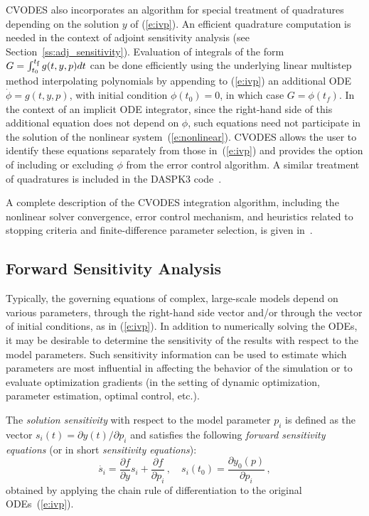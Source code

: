 CVODES also incorporates an algorithm for special treatment of
quadratures depending on the solution $y$ of (\ref{e:ivp}).
An efficient quadrature computation is needed in the context of
adjoint sensitivity analysis (see Section~\ref{ss:adj_sensitivity}).
Evaluation of integrals of the form
$G = \int_{t_0}^{t_\mb{f}} g(t,y,p) dt$ can be done efficiently using the
underlying linear multistep method interpolating polynomials by
appending to (\ref{e:ivp}) an additional ODE
$\dot\phi = g(t,y,p)$, with initial condition $\phi(t_0) = 0$,
in which case $G = \phi(t_f)$. In the context of an implicit ODE
integrator, since the right-hand side of this additional equation does not
depend on $\phi$, such equations need not participate in the solution of
the nonlinear system~(\ref{e:nonlinear}). CVODES allows the user to
identify these equations separately from those in~(\ref{e:ivp}) and
provides the option of including or excluding $\phi$ from the error
control algorithm.
A similar treatment of quadratures is included in the DASPK3
code~\cite{LiPe:99a,LiPe:00}.


A complete description of the CVODES integration algorithm, including 
the nonlinear solver convergence, error control mechanism, and heuristics 
related to stopping criteria and finite-difference parameter selection, is
given in~\cite{HBGLSSW:04}.


\subsection{Forward Sensitivity Analysis}\label{ss:fwd_sensitivity}

Typically, the governing equations of complex, large-scale models
depend on various parameters,  through the right-hand side vector 
and/or through the vector of initial conditions, as in (\ref{e:ivp}).
In addition to numerically solving the ODEs, it may be desirable to
determine the sensitivity of the results with respect to the model
parameters. 
Such sensitivity information can be used to estimate which
parameters are most influential in affecting the behavior of the
simulation or to evaluate optimization gradients (in the setting of dynamic
optimization, parameter estimation, optimal control, etc.).

The {\em solution sensitivity} with respect to the model parameter
$p_i$ is defined as the vector 
$s_i (t) = {\partial y(t)}/{\partial p_i}$
and satisfies the following {\em forward sensitivity equations}
(or in short {\em sensitivity equations}):
\begin{equation}\label{e:sens_eqns}
\dot{s_i}  = \frac{\partial f}{\partial y} s_i + \frac{\partial f}{\partial p_i} \, ,
\quad s_i(t_0)  = \frac{\partial y_{0}(p)}{\partial p_i} \, ,
\end{equation}
obtained by applying the chain rule of differentiation to the original
ODEs~(\ref{e:ivp}). 

